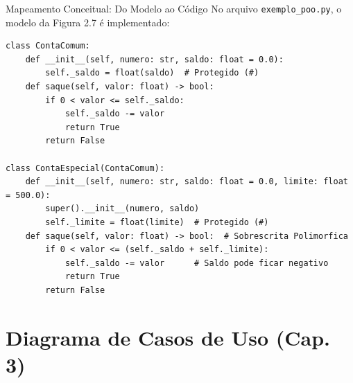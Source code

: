\documentclass[10pt]{beamer}
\begin{document}
\begin{frame}[fragile]{Mapeamento Conceitual: Do Modelo ao Código}
    No arquivo \texttt{exemplo\_poo.py}, o modelo da Figura 2.7 é implementado:
\begin{lstlisting}
class ContaComum:
    def __init__(self, numero: str, saldo: float = 0.0):
        self._saldo = float(saldo)  # Protegido (#)
    def saque(self, valor: float) -> bool:
        if 0 < valor <= self._saldo:
            self._saldo -= valor
            return True
        return False

class ContaEspecial(ContaComum):
    def __init__(self, numero: str, saldo: float = 0.0, limite: float = 500.0):
        super().__init__(numero, saldo)
        self._limite = float(limite)  # Protegido (#)
    def saque(self, valor: float) -> bool:  # Sobrescrita Polimorfica
        if 0 < valor <= (self._saldo + self._limite):
            self._saldo -= valor      # Saldo pode ficar negativo
            return True
        return False
\end{lstlisting}
\end{frame}

\section{Diagrama de Casos de Uso (Cap. 3)}
\end{document}
